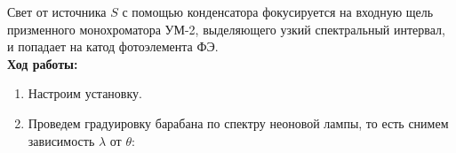 \documentclass[a4paper, 12pt]{article}%
\begin{document}
	Свет от источника $S$ с помощью конденсатора фокусируется на входную щель призменного монохроматора УМ-2,  выделяющего узкий спектральный интервал,  и попадает на катод фотоэлемента ФЭ.\\
	
\textbf{Ход работы:}\\\par

\begin{enumerate}

	\item Настроим установку.
	
	\item Проведем градуировку барабана по спектру неоновой лампы,  то есть снимем зависимость $\lambda$ от $\theta$:

\newpage
	

\end{enumerate}
\end{document}
